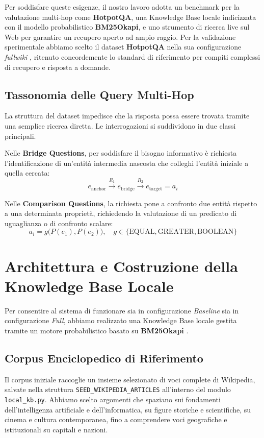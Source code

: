 Per soddisfare queste esigenze, il nostro lavoro adotta un benchmark per la valutazione multi-hop come \textbf{HotpotQA}, una Knowledge Base locale indicizzata con il modello probabilistico \textbf{BM25Okapi}, e uno strumento di ricerca live sul Web per garantire un recupero aperto ad ampio raggio. 
Per la validazione sperimentale abbiamo scelto il dataset \textbf{HotpotQA} nella sua configurazione \textit{fullwiki} \cite{yang2018hotpotqa}, ritenuto concordemente lo standard di riferimento per compiti complessi di recupero e risposta a domande.

\subsection{Tassonomia delle Query Multi-Hop}
La struttura del dataset impedisce che la risposta possa essere trovata tramite una semplice ricerca diretta. Le interrogazioni si suddividono in due classi principali.

Nelle \textbf{Bridge Questions}, per soddisfare il bisogno informativo è richiesta l'identificazione di un'entità intermedia nascosta che colleghi l'entità iniziale a quella cercata:
\begin{equation}
e_{\text{anchor}} \xrightarrow{R_1} e_{\text{bridge}} \xrightarrow{R_2} e_{\text{target}} = a_i
\end{equation}

Nelle \textbf{Comparison Questions}, la richiesta pone a confronto due entità rispetto a una determinata proprietà, richiedendo la valutazione di un predicato di uguaglianza o di confronto scalare:
\begin{equation}
a_i = g\big(P(e_1), P(e_2)\big), \quad g \in \{\text{EQUAL}, \text{GREATER}, \text{BOOLEAN}\}
\end{equation}

\section{Architettura e Costruzione della Knowledge Base Locale}
\label{sec:local_kb}

Per consentire al sistema di funzionare sia in configurazione \textit{Baseline} sia in configurazione \textit{Full}, abbiamo realizzato una Knowledge Base locale gestita tramite un motore probabilistico basato su \textbf{BM25Okapi} \cite{robertson2009probabilistic}.

\subsection{Corpus Enciclopedico di Riferimento}
Il corpus iniziale raccoglie un insieme selezionato di voci complete di Wikipedia, salvate nella struttura \texttt{SEED\_WIKIPEDIA\_ARTICLES} all'interno del modulo \texttt{local\_kb.py}. Abbiamo scelto argomenti che spaziano sui fondamenti dell'intelligenza artificiale e dell'informatica, su figure storiche e scientifiche, su cinema e cultura contemporanea, fino a comprendere voci geografiche e istituzionali su capitali e nazioni.

